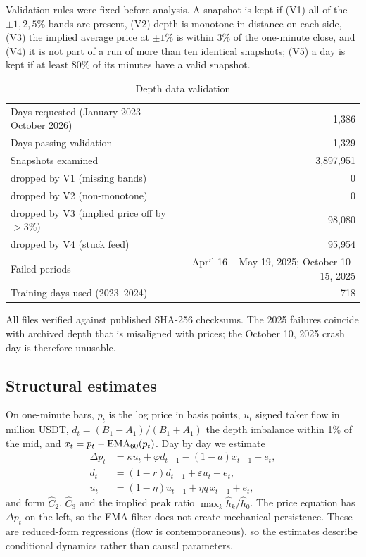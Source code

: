 \documentclass[12pt]{article}
\theoremstyle{definition}
\theoremstyle{remark}
\begin{document}
Validation rules were fixed before analysis. A snapshot is kept if (V1) all of the $\pm1,2,5\%$ bands are present, (V2) depth is monotone in distance on each side, (V3) the implied average price at $\pm1\%$ is within 3\% of the one-minute close, and (V4) it is not part of a run of more than ten identical snapshots; (V5) a day is kept if at least 80\% of its minutes have a valid snapshot.

\begin{table}[t]\centering\small
\begin{threeparttable}
\caption{Depth data validation}\label{tab:d2}
\begin{tabular}{lr}
\toprule
Days requested (January 2023 -- October 2026) & 1{,}386\\
Days passing validation & 1{,}329\\
Snapshots examined & 3{,}897{,}951\\
\quad dropped by V1 (missing bands) & 0\\
\quad dropped by V2 (non-monotone) & 0\\
\quad dropped by V3 (implied price off by $>3\%$) & 98{,}080\\
\quad dropped by V4 (stuck feed) & 95{,}954\\
Failed periods & April 16 -- May 19, 2025; October 10--15, 2025\\
Training days used (2023--2024) & 718\\
\bottomrule
\end{tabular}
\begin{tablenotes}\footnotesize\item All files verified against published SHA-256 checksums. The 2025 failures coincide with archived depth that is misaligned with prices; the October 10, 2025 crash day is therefore unusable. \end{tablenotes}
\end{threeparttable}
\end{table}

\subsection{Structural estimates}
On one-minute bars, $p_t$ is the log price in basis points, $u_t$ signed taker flow in million USDT, $d_t=(B_1-A_1)/(B_1+A_1)$ the depth imbalance within 1\% of the mid, and $x_t=p_t-{\rm EMA}_{60}(p_t)$. Day by day we estimate
\begin{align*}
\Delta p_t&=\kappa u_t+\varphi d_{t-1}-(1-a)x_{t-1}+e_t,\\
d_t&=(1-r)d_{t-1}+\varepsilon u_t+e_t,\\
u_t&=(1-\eta)u_{t-1}+\eta q\,x_{t-1}+e_t,
\end{align*}
and form $\hat C_2$, $\hat C_3$ and the implied peak ratio $\max_k\hat h_k/\hat h_0$. The price equation has $\Delta p_t$ on the left, so the EMA filter does not create mechanical persistence. These are reduced-form regressions (flow is contemporaneous), so the estimates describe conditional dynamics rather than causal parameters.
\end{document}
